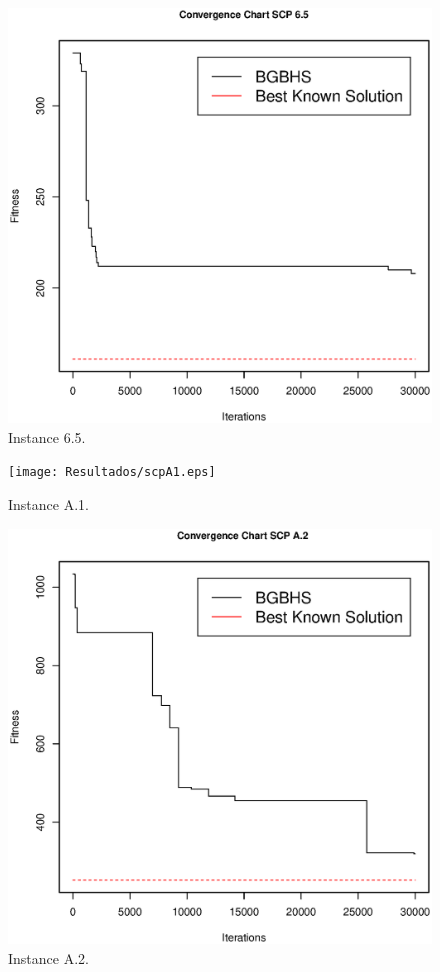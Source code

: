 \begin{figure}[]
\centering
\includegraphics[scale=.45]{Resultados/scp65.eps}
\caption{Instance 6.5.}
\label{fig:Instance.6.5}
\end{figure}

\begin{figure}[]
\centering
\texttt{[image: Resultados/scpA1.eps]}
\caption{Instance A.1.}
\label{fig:Instance.A.1}
\end{figure}

\begin{figure}[]
\centering
\includegraphics[scale=.45]{Resultados/scpA2.eps}
\caption{Instance A.2.}
\label{fig:Instance.A.2}
\end{figure}

